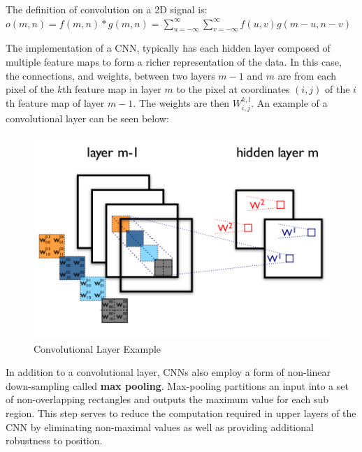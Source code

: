 \documentclass[12pt, titlepage]{article}
\begin{document}
  The definition of convolution on a 2D signal is: \\
  $o(m,n) = f(m,n) \ast g(m,n) = \sum_{u=-\infty}^{\infty} \sum_{v=-\infty}^{\infty} f(u,v)g(m - u,n - v)$
  
  The implementation of a CNN, typically has each hidden layer composed of multiple feature maps to form a richer
  representation of the data. In this case, the connections, and weights, between two layers $m-1$ and $m$ are from each
  pixel of the $k$th feature map in layer $m$ to the pixel at coordinates $(i,j)$ of the $i$th feature map of layer $m-1$.
  The weights are then $W_{i,j}^{k,l}$. An example of a convolutional layer can be seen below: \\
  \FloatBarrier
  \begin{figure}[h]
    \caption{Convolutional Layer Example}
    \centering
    \includegraphics[scale=0.5]{images/conv_layer_cnn_example}
  \end{figure}
  \FloatBarrier
  
  In addition to a convolutional layer, CNNs also employ a form of non-linear down-sampling called \textbf{max pooling}.
  Max-pooling partitions an input into a set of non-overlapping rectangles and outputs the maximum value for each sub region.
  This step serves to reduce the computation required in upper layers of the CNN by eliminating non-maximal values as well as
  providing additional robustness to position.
  
\end{document}
